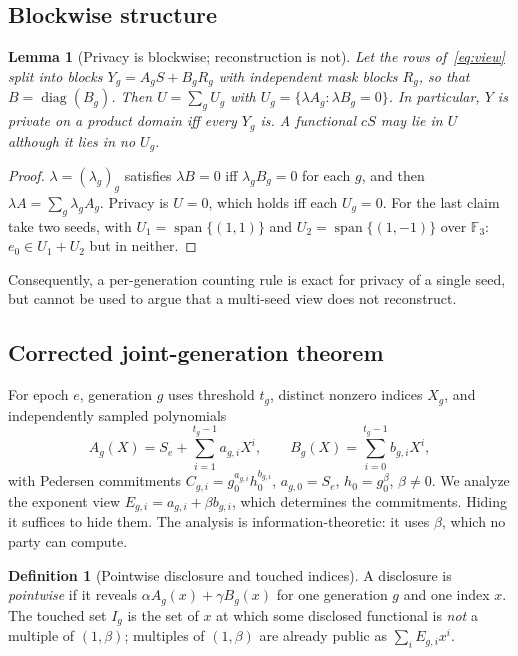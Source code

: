 \documentclass[pdflatex,sn-mathphys-num]{sn-jnl}
\theoremstyle{plain}
\newtheorem{lemma}[theorem]{Lemma}
\theoremstyle{definition}
\newtheorem{definition}[theorem]{Definition}
\newcommand{\F}{\mathbb{F}}
\begin{document}
\subsection{Blockwise structure}
\begin{lemma}[Privacy is blockwise; reconstruction is not]\label{lem:block}
Let the rows of~\eqref{eq:view} split into blocks $Y_g=A_gS+B_gR_g$ with independent mask blocks $R_g$, so that $B=\operatorname{diag}(B_g)$. Then $U=\sum_gU_g$ with $U_g=\{\lambda A_g:\lambda B_g=0\}$. In particular, $Y$ is private on a product domain iff every $Y_g$ is. A functional $cS$ may lie in $U$ although it lies in no $U_g$.
\end{lemma}
\begin{proof}
$\lambda=(\lambda_g)_g$ satisfies $\lambda B=0$ iff $\lambda_gB_g=0$ for each $g$, and then $\lambda A=\sum_g\lambda_gA_g$. Privacy is $U=0$, which holds iff each $U_g=0$. For the last claim take two seeds, with $U_1=\operatorname{span}\{(1,1)\}$ and $U_2=\operatorname{span}\{(1,-1)\}$ over $\F_3$: $e_0\in U_1+U_2$ but in neither.
\end{proof}

Consequently, a per-generation counting rule is exact for privacy of a single seed, but cannot be used to argue that a multi-seed view does not reconstruct.

\subsection{Corrected joint-generation theorem}
For epoch $e$, generation $g$ uses threshold $t_g$, distinct nonzero indices $X_g$, and independently sampled polynomials
\begin{equation}\label{eq:sharing}
 A_g(X)=S_e+\sum_{i=1}^{t_g-1}a_{g,i}X^i,
 \qquad B_g(X)=\sum_{i=0}^{t_g-1}b_{g,i}X^i,
\end{equation}
with Pedersen commitments $C_{g,i}=g_0^{a_{g,i}}h_0^{b_{g,i}}$, $a_{g,0}=S_e$, $h_0=g_0^\beta$, $\beta\ne0$. We analyze the exponent view $E_{g,i}=a_{g,i}+\beta b_{g,i}$, which determines the commitments. Hiding it suffices to hide them. The analysis is information-theoretic: it uses $\beta$, which no party can compute.

\begin{definition}[Pointwise disclosure and touched indices]
A disclosure is \emph{pointwise} if it reveals $\alpha A_g(x)+\gamma B_g(x)$ for one generation $g$ and one index $x$. The touched set $I_g$ is the set of $x$ at which some disclosed functional is \emph{not} a multiple of $(1,\beta)$; multiples of $(1,\beta)$ are already public as $\sum_iE_{g,i}x^i$.
\end{definition}
\end{document}
